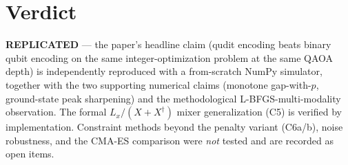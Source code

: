 \documentclass[11pt]{article}
\begin{document}
\section{Verdict}
\textbf{REPLICATED} --- the paper's headline claim (qudit encoding beats
binary qubit encoding on the same integer-optimization problem at the
same QAOA depth) is independently reproduced with a from-scratch
NumPy simulator, together with the two supporting numerical claims
(monotone gap-with-$p$, ground-state peak sharpening) and the
methodological L-BFGS-multi-modality observation. The formal
$L_x/(X+X^\dagger)$ mixer generalization (C5) is verified by
implementation. Constraint methods beyond the penalty variant (C6a/b),
noise robustness, and the CMA-ES comparison were \emph{not} tested and
are recorded as open items.


\end{document}

